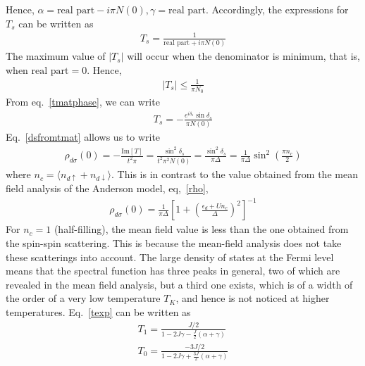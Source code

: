 Hence, \(\alpha = \text{real part} - i\pi N(0), \gamma =\text{real part}\).
Accordingly, the expressions for \(T_s\) can be written as
\begin{equation}\begin{aligned}
T_s = \frac{1}{\text{real part} + i \pi N(0)}
\end{aligned}\end{equation}
The maximum value of \(|T_s|\) will occur when the denominator is minimum, that is, when \(\text{real part} = 0\).
Hence,
\begin{equation}\begin{aligned}
|T_s| \leq \frac{1}{\pi N_0}
\end{aligned}\end{equation}
From eq.~\ref{tmatphase}, we can write
\begin{equation}\begin{aligned}
T_s = -\frac{e^{i \delta_s}\sin \delta_s}{\pi N(0)}
\end{aligned}\end{equation}
Eq.~\ref{dsfromtmat} allows us to write
\begin{equation}\begin{aligned}
	\rho_{d\sigma}(0) = -\frac{\text{Im}[T]}{t^2 \pi} = \frac{\sin^2 \delta_s}{t^2 \pi^2 N(0)} = \frac{\sin^2 \delta_s}{\pi \Delta} = \frac{1}{\pi \Delta}\sin^2 \left(\frac{\pi n_c}{2}\right)
\end{aligned}\end{equation}
where \(n_c = \langle  n_{d\uparrow}+n_{d\downarrow}\rangle\).
This is in contrast to the value obtained from the mean field analysis of the Anderson model, eq,~\ref{rho},
\begin{equation}\begin{aligned}
	\rho_{d\sigma}(0) = \frac{1}{\pi \Delta}\left[1 + \left(\frac{\epsilon_d + Un_c}{\Delta}\right)^{2}\right]^{-1}
\end{aligned}\end{equation}
For \(n_c =1\) (half-filling), the mean field value is less than the one obtained from the spin-spin scattering.
This is because the mean-field analysis does not take these scatterings into account.
The large density of states at the Fermi level means that the spectral function has three peaks in general, two of which are revealed in the mean field analysis, but a third one exists, which is of a width of the order of a very low temperature \(T_K\), and hence is not noticed at higher temperatures.
Eq.~\ref{texp} can be written as
\begin{gather}
	T_1 = \frac{J/2}{1 - 2 J \gamma - \frac{J}{2}\left(\alpha + \gamma\right)}\\
	T_0 = \frac{-3J/2}{1 - 2 J \gamma + \frac{3J}{2}\left(\alpha + \gamma\right)}
\end{gather}
